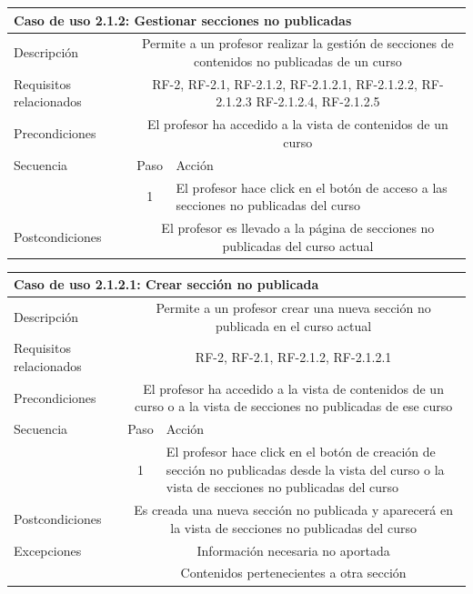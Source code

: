 \hspace{3cm}

\begin{adjustwidth}{-2cm}{}
\begin{tabular}[H]{l c l}
\toprule 
\multicolumn{3}{l}{\textbf{Caso de uso 2.1.2: Gestionar secciones no publicadas}}\\
\midrule
Descripción & \multicolumn{2}{p{10cm}}{Permite a un profesor realizar la gestión de secciones de contenidos no publicadas de un curso }\\
\midrule
Requisitos relacionados & \multicolumn{2}{p{10cm}}{RF-2, RF-2.1, RF-2.1.2, RF-2.1.2.1, RF-2.1.2.2, RF-2.1.2.3
RF-2.1.2.4, RF-2.1.2.5}\\
\midrule
Precondiciones & \multicolumn{2}{p{10cm}}{El profesor ha accedido a la vista de contenidos de un curso}\\
\midrule
Secuencia & Paso & Acción \\
\cmidrule{2-3}
         & 1 &  \multicolumn{1}{p{8cm}}{El profesor hace click en el botón de acceso a las secciones no publicadas del curso}\\
\midrule
Postcondiciones & \multicolumn{2}{p{10cm}}{El profesor es llevado a la página de secciones no publicadas del curso actual}\\
\bottomrule 
\end{tabular}

\hspace{3cm}

\begin{tabular}[H]{l c l}
\toprule 
\multicolumn{3}{l}{\textbf{Caso de uso 2.1.2.1: Crear sección no publicada}}\\
\midrule
Descripción & \multicolumn{2}{p{10cm}}{Permite a un profesor crear una nueva sección no publicada en el curso actual}\\
\midrule
Requisitos relacionados & \multicolumn{2}{p{10cm}}{RF-2, RF-2.1, RF-2.1.2, RF-2.1.2.1}\\
\midrule
Precondiciones & \multicolumn{2}{p{10cm}}{El profesor ha accedido a la vista de contenidos de un curso o a la vista de secciones no publicadas de ese curso}\\
\midrule
Secuencia & Paso & Acción \\
\cmidrule{2-3}
         & 1 &  \multicolumn{1}{p{8cm}}{El profesor hace click en el botón de creación de sección no publicadas desde la vista del curso o la vista de secciones no publicadas del curso}\\
\midrule
Postcondiciones & \multicolumn{2}{p{10cm}}{Es creada una nueva sección no publicada y aparecerá en la vista de secciones no publicadas del curso}\\
\midrule
Excepciones & \multicolumn{2}{p{10cm}}{Información necesaria no aportada}\\
            & \multicolumn{2}{p{10cm}}{Contenidos pertenecientes a otra sección}\\
\bottomrule 
\end{tabular}
\end{adjustwidth}
\hspace{3cm}


